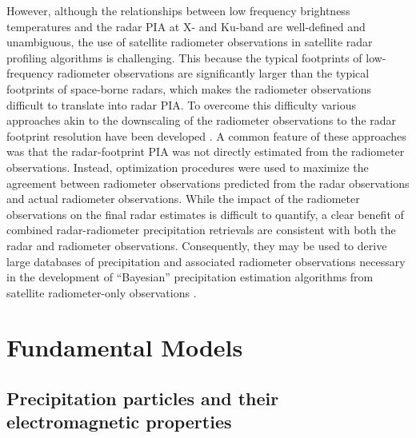 \documentclass[10pt]{ietbook}
\begin{document}
However, although the relationships between low frequency brightness temperatures and the radar PIA at X- and Ku-band are well-defined and unambiguous, the use of satellite
radiometer observations in satellite radar profiling algorithms is challenging. This because the typical footprints of low-frequency radiometer observations are significantly
larger than the typical footprints of space-borne radars, which makes the radiometer observations difficult to translate into radar PIA. To overcome this difficulty various
approaches akin to the downscaling of the radiometer observations to the radar footprint resolution have been developed \cite{haddad1997,grecu2004,masunaga2005,munchak2011}.
A common feature of these approaches was that the radar-footprint PIA was not directly estimated from the radiometer observations. Instead, 
optimization procedures were used to maximize the agreement between radiometer observations predicted from the radar observations and actual radiometer observations.  While
the impact of the radiometer observations on the final radar estimates is difficult to quantify, a clear benefit of combined radar-radiometer precipitation retrievals
are consistent with both the radar and radiometer observations.  Consequently, they may be used to derive large databases of precipitation and associated radiometer observations
necessary in the development of “Bayesian” precipitation estimation algorithms from satellite
radiometer-only observations \cite{grecu2006,kummerow2011,hou2014}. 

\section{Fundamental Models}

\subsection{Precipitation particles and their electromagnetic properties}
\end{document}
